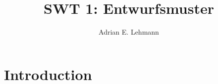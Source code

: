 \documentclass[a4paper]{article}
\title{SWT 1: Entwurfsmuster}
\author{Adrian E. Lehmann}
\begin{document}
	\section{Introduction}
	
	
\end{document}
